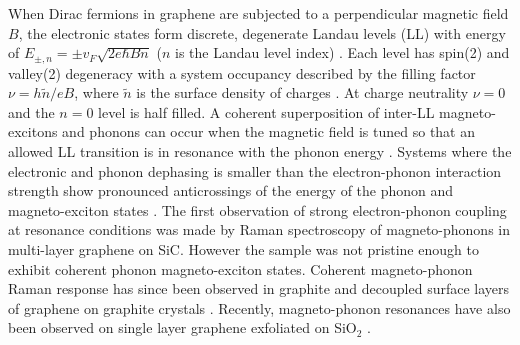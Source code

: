 \documentclass[prl,aps,superscriptaddress,showpacs,reprint]{revtex4-1}
\begin{document}
When Dirac fermions in graphene are subjected to a perpendicular magnetic field $B$, the electronic states form discrete, degenerate Landau levels (LL) with energy of $E_{\pm, n}=\pm v_F\sqrt{2e\hbar Bn}$ ($n$ is the Landau level index) \cite{neto2009electronic,goerbig2011electronic}. Each level has spin(2) and valley(2) degeneracy with a system occupancy described by the filling factor $\nu = h\widetilde{n}/eB$, where $\widetilde{n}$ is the surface density of charges \cite{goerbig2007filling}.
At charge neutrality $\nu = 0$ and the $n=0$ level is half filled. A coherent superposition of inter-LL magneto-excitons and phonons can occur when the magnetic field is tuned so that an allowed LL transition is in resonance with the phonon energy \cite{ando2007magnetic,goerbig2007filling,goerbig2011electronic}. Systems where the electronic and phonon dephasing is smaller than the electron-phonon interaction strength show pronounced anticrossings of the energy of the phonon and magneto-exciton states \cite{ando2007magnetic,goerbig2007filling,goerbig2011electronic,PhysRevB.84.235138,kim2012magnetophonon,yan2010observation,kuhne2012polarization,faugeras2011magneto,yan2010observation}.
The first observation of strong electron-phonon coupling at resonance conditions was made by Raman spectroscopy of magneto-phonons in multi-layer graphene on SiC. However the sample was not pristine enough to exhibit coherent phonon magneto-exciton states\cite{faugeras2009tuning}. Coherent magneto-phonon Raman response has since been observed in graphite \cite{PhysRevB.84.235138,kim2012magnetophonon,yan2010observation} and decoupled surface layers of graphene on graphite crystals \cite{kuhne2012polarization,faugeras2011magneto,yan2010observation}. Recently, magneto-phonon resonances have also been observed on single layer graphene exfoliated on SiO$_2$ \cite{PhysRevLett.110.227402,kossacki2012circular}.
\end{document}
